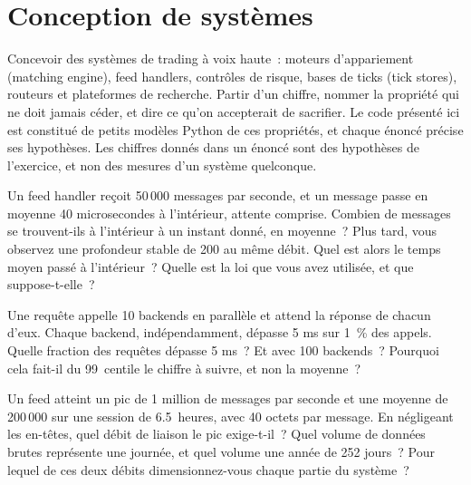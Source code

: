 \chapter{Conception de systèmes}\label{ch:iv3:system-design}

\begin{ivtrains}
Concevoir des systèmes de trading à voix haute~: moteurs d'appariement (matching engine), feed handlers, contrôles de risque, bases de ticks (tick stores), routeurs et plateformes de recherche. Partir d'un chiffre, nommer la propriété qui ne doit jamais céder, et dire ce qu'on accepterait de sacrifier. Le code présenté ici est constitué de petits modèles Python de ces propriétés, et chaque énoncé précise ses hypothèses. Les chiffres donnés dans un énoncé sont des hypothèses de l'exercice, et non des mesures d'un système quelconque.
\end{ivtrains}

\begin{question}\label{iq:iv3:system-design:1}
Un feed handler reçoit 50\,000 messages par seconde, et un message passe en moyenne 40 microsecondes à l'intérieur, attente comprise. Combien de messages se trouvent-ils à l'intérieur à un instant donné, en moyenne~? Plus tard, vous observez une profondeur stable de 200 au même débit. Quel est alors le temps moyen passé à l'intérieur~? Quelle est la loi que vous avez utilisée, et que suppose-t-elle~?
\end{question}

\begin{question}\label{iq:iv3:system-design:2}
Une requête appelle 10 backends en parallèle et attend la réponse de chacun d'eux. Chaque backend, indépendamment, dépasse 5 ms sur 1~\% des appels. Quelle fraction des requêtes dépasse 5 ms~? Et avec 100 backends~? Pourquoi cela fait-il du 99~centile le chiffre à suivre, et non la moyenne~?
\end{question}

\begin{question}\label{iq:iv3:system-design:3}
Un feed atteint un pic de 1 million de messages par seconde et une moyenne de 200\,000 sur une session de 6.5~heures, avec 40 octets par message. En négligeant les en-têtes, quel débit de liaison le pic exige-t-il~? Quel volume de données brutes représente une journée, et quel volume une année de 252 jours~? Pour lequel de ces deux débits dimensionnez-vous chaque partie du système~?
\end{question}

